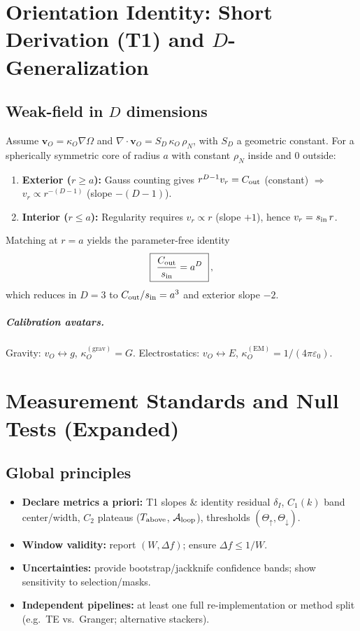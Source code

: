 \documentclass[12pt,a4paper,oneside]{scrreprt}
\begin{document}
\chapter{Orientation Identity: Short Derivation (T1) and $D$-Generalization}\label{app:T1}
\section*{Weak-field in $D$ dimensions}
Assume $\mathbf v_O=\kappa_O\nabla\Omega$ and $\nabla\!\cdot\mathbf v_O=S_D\,\kappa_O\,\rho_N$, with $S_D$ a geometric constant. For a spherically symmetric core of radius $a$ with constant $\rho_N$ inside and $0$ outside:
\begin{enumerate}
\item \textbf{Exterior ($r\ge a$):} Gauss counting gives $r^{D-1}v_r=C_{\rm out}$ (constant) $\Rightarrow$ $v_r\propto r^{-(D-1)}$ (slope $-(D-1)$).
\item \textbf{Interior ($r\le a$):} Regularity requires $v_r\propto r$ (slope $+1$), hence $v_r=s_{\rm in}\,r$.
\end{enumerate}
Matching at $r=a$ yields the parameter-free identity
\[
\boxed{~\frac{C_{\rm out}}{s_{\rm in}}=a^{D}~}\,,
\]
which reduces in $D=3$ to $C_{\rm out}/s_{\rm in}=a^3$ and exterior slope $-2$.

\paragraph{Calibration avatars.}
Gravity: $v_O\leftrightarrow g$, $\kappa_O^{(\mathrm{grav})}=G$. \quad
Electrostatics: $v_O\leftrightarrow E$, $\kappa_O^{(\mathrm{EM})}=1/(4\pi\varepsilon_0)$.

\chapter{Measurement Standards and Null Tests (Expanded)}\label{app:standards}
\section*{Global principles}
\begin{itemize}
\item \textbf{Declare metrics a priori:} T1 slopes \& identity residual $\delta_I$, $C_1(k)$ band center/width, $C_2$ plateaus ($T_{\rm above}$, $\mathcal A_{\rm loop}$), thresholds $(\Theta_\uparrow,\Theta_\downarrow)$.
\item \textbf{Window validity:} report $(W,\Delta f)$; ensure $\Delta f\le 1/W$.
\item \textbf{Uncertainties:} provide bootstrap/jackknife confidence bands; show sensitivity to selection/masks.
\item \textbf{Independent pipelines:} at least one full re-implementation or method split (e.g.\ TE vs.\ Granger; alternative stackers).
\end{itemize}
\end{document}
